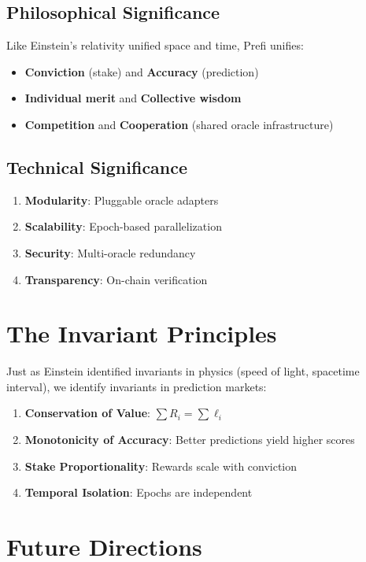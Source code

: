 \documentclass[12pt,a4paper]{article}
\begin{document}
\subsection{Philosophical Significance}
Like Einstein's relativity unified space and time, Prefi unifies:
\begin{itemize}
\item \textbf{Conviction} (stake) and \textbf{Accuracy} (prediction)
\item \textbf{Individual merit} and \textbf{Collective wisdom}
\item \textbf{Competition} and \textbf{Cooperation} (shared oracle infrastructure)
\end{itemize}

\subsection{Technical Significance}
\begin{enumerate}
\item \textbf{Modularity}: Pluggable oracle adapters
\item \textbf{Scalability}: Epoch-based parallelization
\item \textbf{Security}: Multi-oracle redundancy
\item \textbf{Transparency}: On-chain verification
\end{enumerate}

\section{The Invariant Principles}

Just as Einstein identified invariants in physics (speed of light, spacetime interval), we identify invariants in prediction markets:

\begin{enumerate}
\item \textbf{Conservation of Value}: $\sum R_i = \sum \ell_i$
\item \textbf{Monotonicity of Accuracy}: Better predictions yield higher scores
\item \textbf{Stake Proportionality}: Rewards scale with conviction
\item \textbf{Temporal Isolation}: Epochs are independent
\end{enumerate}

\section{Future Directions}
\end{document}
